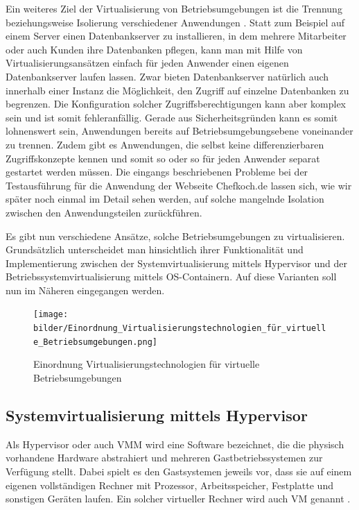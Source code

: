 Ein weiteres Ziel der Virtualisierung von Betriebsumgebungen ist die Trennung beziehungsweise Isolierung verschiedener Anwendungen \citep[Vgl.][Abstract]{Schee14}. Statt zum Beispiel auf einem Server einen Datenbankserver zu installieren, in dem mehrere Mitarbeiter oder auch Kunden ihre Datenbanken pflegen, kann man mit Hilfe von Virtualisierungsansätzen einfach für jeden Anwender einen eigenen Datenbankserver laufen lassen. Zwar bieten Datenbankserver natürlich auch innerhalb einer Instanz die Möglichkeit, den Zugriff auf einzelne Datenbanken zu begrenzen. Die Konfiguration solcher Zugriffsberechtigungen kann aber komplex sein und ist somit fehleranfällig. Gerade aus Sicherheitsgründen kann es somit lohnenswert sein, Anwendungen bereits auf Betriebsumgebungsebene voneinander zu trennen. Zudem gibt es Anwendungen, die selbst keine differenzierbaren Zugriffskonzepte kennen und somit so oder so für jeden Anwender separat gestartet werden müssen. Die eingangs beschriebenen Probleme bei der Testausführung für die Anwendung der Webseite Chefkoch.de lassen sich, wie wir später noch einmal im Detail sehen werden, auf solche mangelnde Isolation zwischen den Anwendungsteilen zurückführen.

Es gibt nun verschiedene Ansätze, solche Betriebsumgebungen zu virtualisieren. Grundsätzlich unterscheidet man hinsichtlich ihrer Funktionalität und Implementierung zwischen der Systemvirtualisierung mittels Hypervisor und der Betriebssystemvirtualisierung mittels OS-Containern. Auf diese Varianten soll nun im Näheren eingegangen werden.

\begin{figure}[!ht]
  \begin{center}
    \texttt{[image: bilder/Einordnung\_Virtualisierungstechnologien\_für\_virtuelle\_Betriebsumgebungen.png]}
    \caption{Einordnung Virtualisierungstechnologien für virtuelle Betriebsumgebungen \citep{Hirschbach06}}
  \end{center}
\end{figure}

\subsection{Systemvirtualisierung mittels Hypervisor}

Als Hypervisor oder auch \ac{VMM} wird eine Software bezeichnet, die die physisch vorhandene Hardware abstrahiert und mehreren Gastbetriebssystemen zur Verfügung stellt. Dabei spielt es den Gastsystemen jeweils vor, dass sie auf einem eigenen vollständigen Rechner mit Prozessor, Arbeitsspeicher, Festplatte und sonstigen Geräten laufen. Ein solcher virtueller Rechner wird auch \ac{VM} genannt \citep[Vgl.][S. 413]{PopGol74}.

